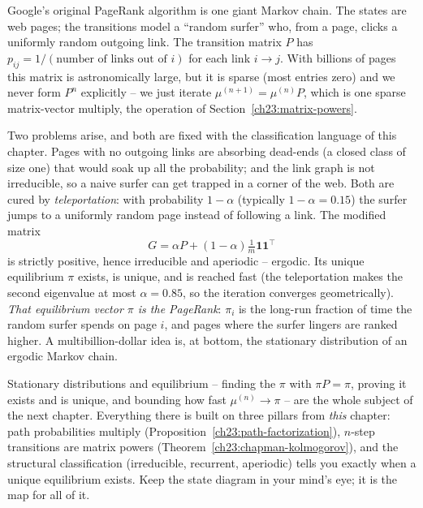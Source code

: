 \begin{applicationbox}
Google's original PageRank algorithm is one giant Markov chain. The states are web pages; the
transitions model a ``random surfer'' who, from a page, clicks a uniformly random outgoing
link. The transition matrix $P$ has $p_{ij} = 1/(\text{number of links out of } i)$ for each
link $i \to j$. With billions of pages this matrix is astronomically large, but it is sparse
(most entries zero) and we never form $P^n$ explicitly -- we just iterate $\mu^{(n+1)} =
\mu^{(n)}P$, which is one sparse matrix-vector multiply, the operation of
Section~\ref{ch23:matrix-powers}.

Two problems arise, and both are fixed with the classification language of this chapter. Pages
with no outgoing links are absorbing dead-ends (a closed class of size one) that would soak up
all the probability; and the link graph is not irreducible, so a naive surfer can get trapped in
a corner of the web. Both are cured by \emph{teleportation}: with probability $1 - \alpha$
(typically $1-\alpha = 0.15$) the surfer jumps to a uniformly random page instead of following a
link. The modified matrix
\[
  G = \alpha P + (1-\alpha)\tfrac{1}{m}\mathbf{1}\mathbf{1}^{\!\top}
\]
is strictly positive, hence irreducible and aperiodic -- ergodic. Its unique equilibrium $\pi$
exists, is unique, and is reached fast (the teleportation makes the second eigenvalue at most
$\alpha = 0.85$, so the iteration converges geometrically). \emph{That equilibrium vector
$\pi$ is the PageRank}: $\pi_i$ is the long-run fraction of time the random surfer spends on
page $i$, and pages where the surfer lingers are ranked higher. A multibillion-dollar idea is,
at bottom, the stationary distribution of an ergodic Markov chain.
\end{applicationbox}

\begin{connectionbox}
Stationary distributions and equilibrium -- finding the $\pi$ with $\pi P = \pi$, proving it
exists and is unique, and bounding how fast $\mu^{(n)} \to \pi$ -- are the whole subject of the
next chapter. Everything there is built on three pillars from \emph{this} chapter: path
probabilities multiply (Proposition~\ref{ch23:path-factorization}), $n$-step transitions are
matrix powers (Theorem~\ref{ch23:chapman-kolmogorov}), and the structural classification
(irreducible, recurrent, aperiodic) tells you exactly when a unique equilibrium exists. Keep
the state diagram in your mind's eye; it is the map for all of it.
\end{connectionbox}

